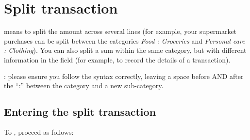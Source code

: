 \section{Split transaction\label{transactions-breakdown}}

 means to split the amount across several lines (for example, your supermarket purchases can be split between the categories \emph{Food : Groceries} and \emph{Personal care : Clothing}). You can also split a sum within the same category, but with different information in the  field (for example, to record the details of a transaction).

\Note{}: please ensure you follow the syntax correctly, leaving a space before AND after the \enquote{:} between the category and a new sub-category.


\subsection{Entering the split transaction\label{transactions-breakdown-master}}

To , proceed as follows:
	 
